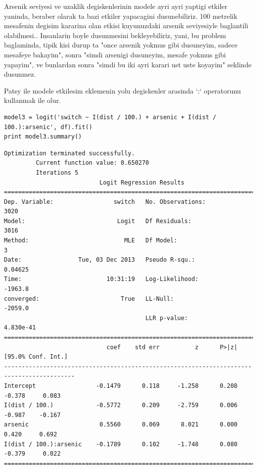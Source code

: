 \documentclass[12pt,fleqn]{article}\usepackage{../common}
\begin{document}
Arsenik seviyesi ve uzaklik degiskenlerinin modele ayri ayri yaptigi
etkiler yaninda, beraber olarak ta bazi etkiler yapacagini
dusunebiliriz.  100 metrelik mesafenin degisim kararina olan etkisi
kuyunuzdaki arsenik seviyesiyle baglantili olabilmesi.. Insanlarin
boyle dusunmesini bekleyebiliriz, yani, bu problem baglaminda, tipik
kisi durup ta "once arsenik yokmus gibi dusuneyim, sadece mesafeye
bakayim", sonra "simdi arsenigi dusuneyim, mesafe yokmus gibi
yapayim", ve bunlardan sonra "simdi bu iki ayri karari ust uste
koyayim" seklinde dusunmez.

Patsy ile modele etkilesim eklemenin yolu degiskenler arasinda `:`
operatorunu kullanmak ile olur.

\begin{verbatim}
model3 = logit('switch ~ I(dist / 100.) + arsenic + I(dist / 100.):arsenic', df).fit()
print model3.summary()
\end{verbatim}

\begin{verbatim}
Optimization terminated successfully.
         Current function value: 0.650270
         Iterations 5
                           Logit Regression Results                           
==============================================================================
Dep. Variable:                 switch   No. Observations:                 3020
Model:                          Logit   Df Residuals:                     3016
Method:                           MLE   Df Model:                            3
Date:                Tue, 03 Dec 2013   Pseudo R-squ.:                 0.04625
Time:                        10:31:19   Log-Likelihood:                -1963.8
converged:                       True   LL-Null:                       -2059.0
                                        LLR p-value:                 4.830e-41
==========================================================================================
                             coef    std err          z      P>|z|      [95.0% Conf. Int.]
------------------------------------------------------------------------------------------
Intercept                 -0.1479      0.118     -1.258      0.208        -0.378     0.083
I(dist / 100.)            -0.5772      0.209     -2.759      0.006        -0.987    -0.167
arsenic                    0.5560      0.069      8.021      0.000         0.420     0.692
I(dist / 100.):arsenic    -0.1789      0.102     -1.748      0.080        -0.379     0.022
==========================================================================================
\end{verbatim}
\end{document}
